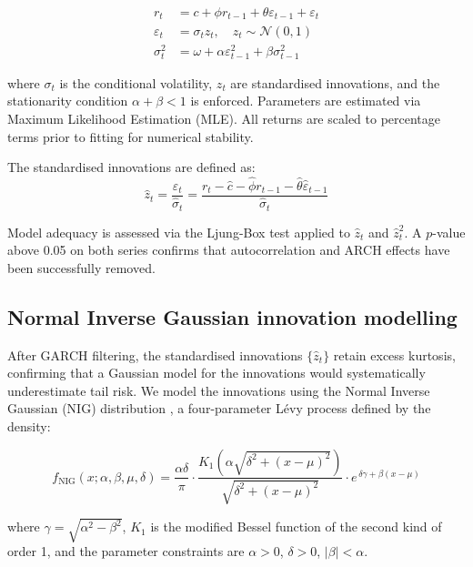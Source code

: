 \documentclass[12pt, a4paper]{article}
\begin{document}
\begin{align}
  r_t &= c + \phi r_{t-1} + \theta \varepsilon_{t-1} + \varepsilon_t 
         \label{eq:arma} \\
  \varepsilon_t &= \sigma_t z_t, \quad z_t \sim \mathcal{N}(0,1) 
         \label{eq:innov} \\
  \sigma_t^2 &= \omega + \alpha \varepsilon_{t-1}^2 + \beta \sigma_{t-1}^2
         \label{eq:garch}
\end{align}

where $\sigma_t$ is the conditional volatility, $z_t$ are 
standardised innovations, and the stationarity condition 
$\alpha + \beta < 1$ is enforced. Parameters are estimated via 
Maximum Likelihood Estimation (MLE). All returns are scaled to 
percentage terms prior to fitting for numerical stability.

The standardised innovations are defined as:
\begin{equation}
  \hat{z}_t = \frac{\varepsilon_t}{\hat{\sigma}_t} 
             = \frac{r_t - \hat{c} - \hat{\phi} r_{t-1} 
               - \hat{\theta}\hat{\varepsilon}_{t-1}}{\hat{\sigma}_t}
\end{equation}

Model adequacy is assessed via the Ljung-Box test applied to 
$\hat{z}_t$ and $\hat{z}_t^2$. A $p$-value above 0.05 on both 
series confirms that autocorrelation and ARCH effects have been 
successfully removed.

\subsection{Normal Inverse Gaussian innovation modelling}

After GARCH filtering, the standardised innovations 
$\{\hat{z}_t\}$ retain excess kurtosis, confirming that a 
Gaussian model for the innovations would systematically 
underestimate tail risk. We model the innovations using the 
Normal Inverse Gaussian (NIG) distribution 
\citep{barndorff1997}, a four-parameter L\'{e}vy process defined 
by the density:

\begin{equation}
  f_{\text{NIG}}(x; \alpha, \beta, \mu, \delta) = 
  \frac{\alpha \delta}{\pi} \cdot
  \frac{K_1\!\left(\alpha\sqrt{\delta^2 + (x-\mu)^2}\right)}
       {\sqrt{\delta^2 + (x-\mu)^2}} \cdot
  e^{\,\delta\gamma + \beta(x-\mu)}
  \label{eq:nig}
\end{equation}

where $\gamma = \sqrt{\alpha^2 - \beta^2}$, $K_1$ is the modified 
Bessel function of the second kind of order 1, and the parameter 
constraints are $\alpha > 0$, $\delta > 0$, 
$|\beta| < \alpha$.
\end{document}
